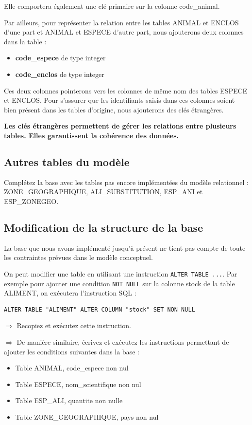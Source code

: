\documentclass[11pt]{article}
\newcommand{\action}{$\Rightarrow$ }
\begin{document}
Elle comportera également une clé primaire sur la colonne code\_animal.

Par ailleurs, pour représenter la relation entre les tables ANIMAL et ENCLOS d'une part et ANIMAL et ESPECE d'autre part, nous ajouterons deux colonnes dans la table :
\begin{itemize}
	\item \textbf{code\_espece} de type integer
	\item \textbf{code\_enclos} de type integer
\end{itemize}

Ces deux colonnes pointerons vers les colonnes de même nom des tables ESPECE et ENCLOS. Pour s'assurer que les identifiants saisis dans ces colonnes soient bien présent dans les tables d'origine, nous ajouterons des clés étrangères.

\textbf{Les clés étrangères permettent de gérer les relations entre plusieurs tables. Elles garantissent la cohérence des données.}

			
\subsection{Autres tables du modèle}
Complétez la base avec les tables pas encore implémentées du modèle relationnel : ZONE\_GEOGRAPHIQUE, ALI\_SUBSTITUTION, ESP\_ANI et ESP\_ZONEGEO.
						

\subsection{Modification de la structure de la base}
La base que nous avons implémenté jusqu'à présent ne tient pas compte de toute les contraintes prévues dans le modèle conceptuel.

On peut modifier une table en utilisant une instruction \lstinline{ALTER TABLE ...}. Par exemple pour ajouter une condition \lstinline{NOT NULL} sur la colonne stock de la table ALIMENT, on exécutera l'instruction SQL :
\begin{lstlisting}
ALTER TABLE "ALIMENT" ALTER COLUMN "stock" SET NON NULL
\end{lstlisting}

\action Recopiez et exécutez cette instruction.

\action De manière similaire, écrivez et exécutez les instructions permettant de ajouter les conditions suivantes dans la base :
\begin{itemize}
	\item Table ANIMAL, code\_espece non nul
	\item Table ESPECE, nom\_scientifique non nul
	\item Table ESP\_ALI, quantite non nulle
	\item Table ZONE\_GEOGRAPHIQUE, pays non nul
\end{itemize}
\end{document}
